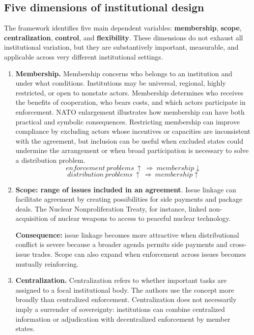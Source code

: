 \subsection{Five dimensions of institutional design}

The framework identifies five main dependent variables: \textbf{membership}, \textbf{scope}, \textbf{centralization}, \textbf{control}, and \textbf{flexibility}. These dimensions do not exhaust all institutional variation, but they are substantively important, measurable, and applicable across very different institutional settings.

\begin{enumerate}
    \item \textbf{Membership.} Membership concerns who belongs to an institution and under what conditions. Institutions may be universal, regional, highly restricted, or open to nonstate actors. Membership determines who receives the benefits of cooperation, who bears costs, and which actors participate in enforcement. NATO enlargement illustrates how membership can have both practical and symbolic consequences. Restricting membership can improve compliance by excluding actors whose incentives or capacities are inconsistent with the agreement, but inclusion can be useful when excluded states could undermine the arrangement or when broad participation is necessary to solve a distribution problem.
    \[enforcement\ problems\ \uparrow\ \Rightarrow\ membership \downarrow\]
    \[distribution\ problems\ \uparrow\ \Rightarrow\ membership \uparrow\]

    \item \textbf{Scope: range of issues included in an agreement}. Issue linkage can facilitate agreement by creating possibilities for side payments and package deals. The Nuclear Nonproliferation Treaty, for instance, linked non-acquisition of nuclear weapons to access to peaceful nuclear technology.

    \textbf{Consequence:} issue linkage becomes more attractive when distributional conflict is severe because a broader agenda permits side payments and cross-issue trades.
    Scope can also expand when enforcement across issues becomes mutually reinforcing.

    \item \textbf{Centralization.} Centralization refers to whether important tasks are assigned to a focal institutional body. The authors use the concept more broadly than centralized enforcement. Centralization does not necessarily imply a surrender of sovereignty: institutions can combine centralized information or adjudication with decentralized enforcement by member states.


\end{enumerate}
